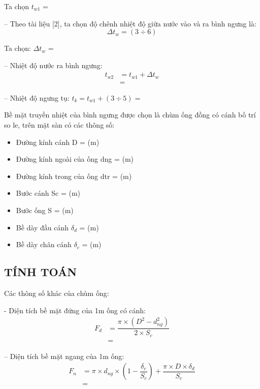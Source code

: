 Ta chọn $t_{w1}$ = 

-- Theo tài liệu [2], ta chọn độ chênh nhiệt độ giữa nước vào và ra bình ngưng là:
\begin{equation*}
	\Delta t_{w} = (3\div 6)
\end{equation*}

Ta chọn: $\Delta t_{w}$ = 

-- Nhiệt độ nước ra bình ngưng:
\begin{equation*}
	\begin{split}
		 t_{w2} &= t_{w1} + \Delta t_{w} \\
		 &= 
	\end{split}
\end{equation*}

-- Nhiệt độ ngưng tụ: $t_{k} = t_{w1} + (3\div 5) = $

Bề mặt truyền nhiệt của bình ngưng được chọn là chùm ống đồng có cánh bố trí so le, trên mặt sàn có các thông số:
\begin{itemize}
	\item Đường kính cánh D =  (m)
	\item Đường kính ngoài của ống d{\scriptsize ng} =  (m)
	\item Đường kính trong của ống d{\scriptsize tr} =  (m)
	\item Bước cánh S{\scriptsize c} =  (m)
	\item Bước ống S =  (m)
	\item Bề dày đầu cánh $\delta_{d}$ =  (m)
	\item Bề dày chân cánh $\delta_{c}$ =  (m)
\end{itemize}

\subsection{TÍNH TOÁN}
Các thông số khác của chùm ống:

- Diện tích bề mặt đứng của 1m ống có cánh:
\begin{equation*}
	\begin{split}
		F_{d} &= \dfrac{\pi\times (D^2 - d^2_{ng})}{2\times S_{c}}\\
		&=
	\end{split}
\end{equation*}

-- Diện tích bề mặt ngang của 1m ống:
\begin{equation*}
\begin{split}
		F_{n} &= \pi\times d_{ng}\times \left(1-\dfrac{\delta_{c}}{S_{c}}\right) + \dfrac{\pi\times D\times \delta_{d}}{S_{c}}\\
		&= 
\end{split}
\end{equation*}

